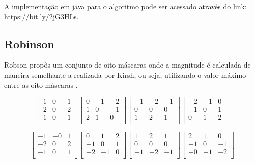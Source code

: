 \documentclass[
	12pt,				%
	oneside,			%
	a4paper,			%
	english,			%
	french,				%
	spanish,			%
	brazil,				%
	]{abntex2}
\begin{document}
A implementação em java para o algoritmo pode ser acessado através do link: \url{https://bit.ly/2jG3HLs}.

\subsection{Robinson}
Robson propôs um conjunto de oito máscaras onde a magnitude é calculada de maneira semelhante a realizada por Kirsh, ou seja, utilizando o valor máximo entre as oito máscaras \cite{pedriniSchwartz:2008}. 

\[
\begin{bmatrix}
     1 &  0 & -1   \\ 
	 2 &  0 & -2   \\ 
	 1 &  0 & -1   \\ 
\end{bmatrix} 
\begin{bmatrix}
     0 & -1 & -2   \\ 
	 1 &  0 & -1   \\ 
	 2 &  1 &  0   \\ 
\end{bmatrix}
\begin{bmatrix}
    -1 & -2 & -1   \\ 
	 0 &  0 &  0   \\ 
	 1 &  2 &  1   \\ 
\end{bmatrix} 
\begin{bmatrix}
    -2 & -1 &  0   \\ 
	-1 &  0 &  1   \\ 
	 0 &  1 &  2   \\ 
\end{bmatrix}
\]

\[
\begin{bmatrix}
    -1 & -0 &  1   \\ 
	-2 &  0 &  2   \\ 
	-1 &  0 &  1   \\ 
\end{bmatrix} 
\begin{bmatrix}
     0 &  1 &  2   \\ 
	-1 &  0 &  1   \\ 
	-2 & -1 &  0   \\ 
\end{bmatrix}
\begin{bmatrix}
     1 &  2 &  1   \\ 
	 0 &  0 &  0   \\ 
	-1 & -2 & -1   \\ 
\end{bmatrix} 
\begin{bmatrix}
     2 &  1 &  0   \\ 
	-1 &  0 & -1   \\ 
	-0 & -1 & -2   \\ 
\end{bmatrix}
\]
\end{document}
